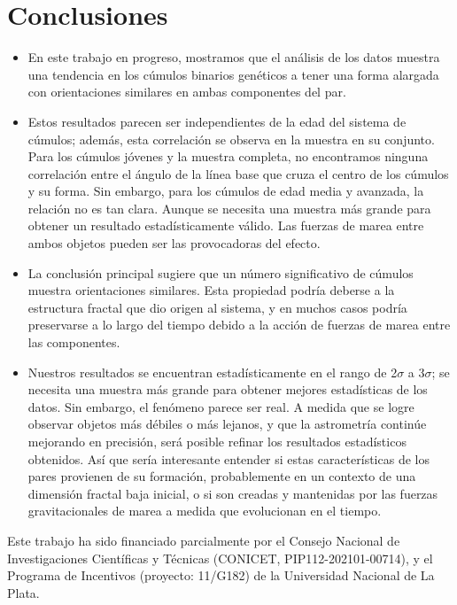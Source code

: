 \documentclass[baaa]{baaa}
\begin{document}
\section{Conclusiones}
\begin{itemize}
\item En este trabajo en progreso, mostramos que el análisis de los datos muestra una tendencia en los cúmulos binarios genéticos a tener una forma alargada con orientaciones similares en ambas componentes del par.
\item Estos resultados parecen ser independientes de la edad del sistema de cúmulos; además, esta correlación se observa en la muestra en su conjunto. Para los cúmulos jóvenes y la muestra completa, no encontramos ninguna correlación entre el ángulo de la línea base que cruza el centro de los cúmulos y su forma. Sin embargo, para los cúmulos de edad media y avanzada, la relación no es tan clara. Aunque se necesita una muestra más grande para obtener un resultado estadísticamente válido. Las fuerzas de marea entre ambos objetos pueden ser las provocadoras del efecto.

\item La conclusión principal sugiere que un número significativo de cúmulos muestra orientaciones similares. Esta propiedad podría deberse a la estructura fractal que dio origen al sistema, y en muchos casos podría preservarse a lo largo del tiempo debido a la acción de fuerzas de marea entre las componentes.
\item Nuestros resultados se encuentran estadísticamente en el rango de 2$\sigma$ a 3$\sigma$; se necesita una muestra más grande para obtener mejores estadísticas de los datos. Sin embargo, el fenómeno parece ser real. A medida que se logre observar objetos más débiles o más lejanos, y que la astrometría continúe mejorando en precisión, será posible refinar los resultados estadísticos obtenidos. Así que sería interesante entender si estas características de los pares provienen de su formación, probablemente en un contexto de una dimensión fractal baja inicial, o si son creadas y mantenidas por las fuerzas gravitacionales de marea a medida que evolucionan en el tiempo.
 \end{itemize}
\vspace{5cm} 
\begin{acknowledgement}
Este trabajo ha sido financiado parcialmente por el Consejo Nacional de Investigaciones Científicas y Técnicas (CONICET, PIP112-202101-00714), y el Programa de Incentivos (proyecto: 11/G182) de la Universidad Nacional de La Plata.
\end{acknowledgement}
\end{document}

